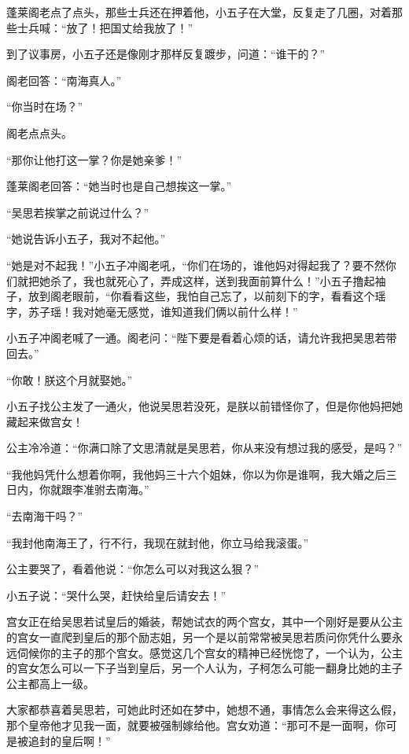 蓬莱阁老点了点头，那些士兵还在押着他，小五子在大堂，反复走了几圈，对着那些士兵喊：“放了！把国丈给我放了！”
\newline

到了议事房，小五子还是像刚才那样反复踱步，问道：“谁干的？”

阁老回答：“南海真人。”

“你当时在场？” 

阁老点点头。

“那你让他打这一掌？你是她亲爹！”

蓬莱阁老回答：“她当时也是自己想挨这一掌。”

“吴思若挨掌之前说过什么？”

“她说告诉小五子，我对不起他。”

“她是对不起我！”小五子冲阁老吼，“你们在场的，谁他妈对得起我了？要不然你们就把她杀了，我也就死心了，弄成这样，送到我面前算什么！”小五子撸起袖子，放到阁老眼前，“你看看这些，我怕自己忘了，以前刻下的字，看看这个瑶字，苏子瑶！我对她毫无感觉，谁知道我们俩以前什么样！”

小五子冲阁老喊了一通。阁老问：“陛下要是看着心烦的话，请允许我把吴思若带回去。”

“你敢！朕这个月就娶她。”
\newline

小五子找公主发了一通火，他说吴思若没死，是朕以前错怪你了，但是你他妈把她藏起来做宫女！

公主冷冷道：“你满口除了文思清就是吴思若，你从来没有想过我的感受，是吗？”

“我他妈凭什么想着你啊，我他妈三十六个姐妹，你以为你是谁啊，我大婚之后三日内，你就跟李准驸去南海。”

“去南海干吗？”

“我封他南海王了，行不行，我现在就封他，你立马给我滚蛋。”

公主要哭了，看着他说：“你怎么可以对我这么狠？”

小五子说：“哭什么哭，赶快给皇后请安去！”
\newline

宫女正在给吴思若试皇后的婚装，帮她试衣的两个宫女，其中一个刚好是要从公主的宫女一直爬到皇后的那个励志姐，另一个是以前常常被吴思若质问你凭什么要永远伺候你的主子的那个宫女。感觉这几个宫女的精神已经恍惚了，一个认为，公主的宫女怎么可以一下子当到皇后，另一个人认为，子柯怎么可能一翻身比她的主子公主都高上一级。

大家都恭喜着吴思若，可她此时还如在梦中，她想不通，事情怎么会来得这么假，那个皇帝他才见我一面，就要被强制嫁给他。宫女劝道：“那可不是一面啊，你可是被追封的皇后啊！”

